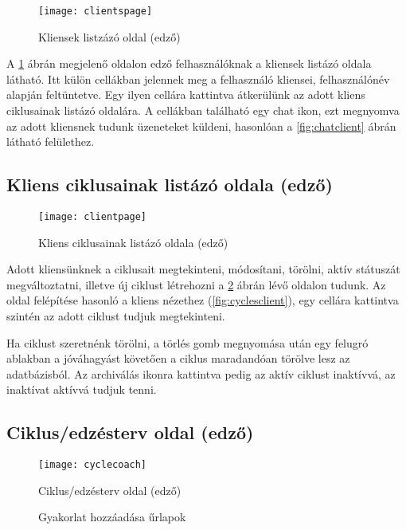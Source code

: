 \begin{figure}[H]
	\centering
	\texttt{[image: clientspage]}
	\caption{Kliensek listzázó oldal (edző)}
	\label{fig:clientspage}
\end{figure}

A \ref{fig:clientspage} ábrán megjelenő oldalon edző felhasználóknak a kliensek listázó oldala látható. Itt külön cellákban jelennek meg a felhasználó kliensei, felhasználónév alapján feltüntetve. Egy ilyen cellára kattintva átkerülünk az adott kliens ciklusainak listázó oldalára. A cellákban található egy chat ikon, ezt megnyomva az adott kliensnek tudunk üzeneteket küldeni, hasonlóan a \ref{fig:chatclient} ábrán látható felülethez.

\subsection{Kliens ciklusainak listázó oldala (edző)}

\begin{figure}[H]
	\centering
	\texttt{[image: clientpage]}
	\caption{Kliens ciklusainak listázó oldala (edző)}
	\label{fig:clientpage}
\end{figure}

Adott kliensünknek a ciklusait megtekinteni, módosítani, törölni, aktív státuszát megváltoztatni, illetve új ciklust létrehozni a \ref{fig:clientpage} ábrán lévő oldalon tudunk. Az oldal felépítése hasonló a kliens nézethez (\ref{fig:cyclesclient}), egy cellára kattintva szintén az adott ciklust tudjuk megtekinteni.

Ha ciklust szeretnénk törölni, a törlés gomb megnyomása után egy felugró ablakban a jóváhagyást követően a ciklus maradandóan törölve lesz az adatbázisból. Az archiválás ikonra kattintva pedig az aktív ciklust inaktívvá, az inaktívat aktívvá tudjuk tenni.

\subsection{Ciklus/edzésterv oldal (edző)}

\begin{figure}[H]
	\centering
	\texttt{[image: cyclecoach]}
	\caption{Ciklus/edzésterv oldal (edző)}
	\label{fig:cyclecoach}
\end{figure}

\begin{figure}[H]
	\centering
	\hspace{5pt}
	\caption{Gyakorlat hozzáadása űrlapok}
	\label{fig:addrexercise}
\end{figure}

